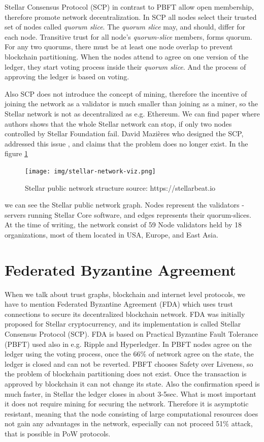 \documentclass[nostrict]{szablonPG}
\begin{document}
Stellar Consensus Protocol (SCP) in contrast to PBFT allow open membership, therefore promote network decentralization. In SCP all nodes select their trusted set of nodes called \textit{quorum slice}. The \textit{quorum slice} may, and should, differ for each node. Transitive trust for all node's \textit{quorum-slice} members, forms quorum. For any two quorums, there must be at least one node overlap to prevent blockchain partitioning. When the nodes attend to agree on one version of the ledger, they start voting process inside their \textit{quorum slice}. And the process of approving the ledger is based on voting. 

Also SCP does not introduce the concept of mining, therefore the incentive of joining the network as a validator is much smaller than joining as a miner, so the Stellar network is not as decentralized as e.g. Ethereum. We can find paper \cite{kim2019stellar} where authors shows that the whole Stellar network can stop, if only two nodes controlled by Stellar Foundation fail. David Mazières who designed the SCP, addressed this issue \cite{Safetyvs90:online}, and claims that the problem does no longer exist. In the figure \ref{fig:network-viz} 
\begin{figure}[h!]
\texttt{[image: img/stellar-network-viz.png]}
\centering
\caption{Stellar public network structure source: https://stellarbeat.io}
\label{fig:network-viz}
\end{figure} 
we can see the Stellar public network graph. Nodes represent the validators - servers running Stellar Core software, and edges represents their quorum-slices. At the time of writing, the network consist of 59 Node validators held by 18 organizations, most of them located in USA, Europe, and East Asia.



\section{Federated Byzantine Agreement}
When we talk about trust graphs, blockchain and internet level protocols, we have to mention Federated Byzantine Agreement (FDA) which uses trust connections to secure its decentralized blockchain network. FDA was initially proposed for Stellar cryptocurrency, and its implementation is called Stellar Consensus Protocol (SCP). FDA is based on Practical Byzantine Fault Tolerance (PBFT) \cite{castro1999practical} used also in e.g. Ripple and Hyperledger. In PBFT nodes agree on the ledger using the voting process, once the 66\% of network agree on the state, the ledger is closed and can not be reverted. PBFT chooses Safety over Liveness, so the problem of blockchain partitioning does not exist. Once the transaction is approved by blockchain it can not change its state. Also the confirmation speed is much faster, in Stellar the ledger closes in about 3-5sec. What is most important it does not require mining for securing the network. Therefore it is asymptotic resistant, meaning that the node consisting of large computational resources does not gain any advantages in the network, especially can not proceed 51\% attack, that is possible in PoW protocols. 
\end{document}
